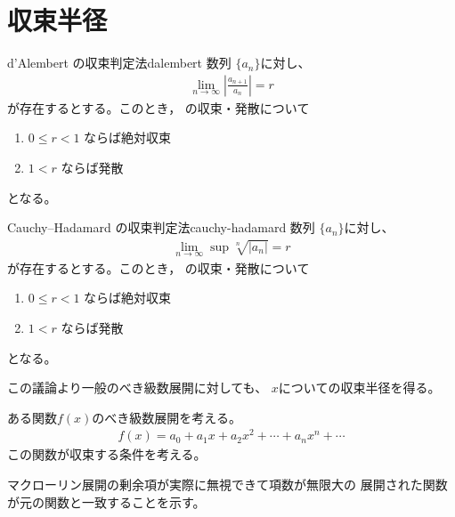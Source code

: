 \newpage
\section{収束半径}
\begin{theorem}{d'Alembert の収束判定法}{dalembert}
  数列 $\{a_{n}\}$に対し、
  \begin{gather}
    \lim_{n\to\infty}\left|\frac{a_{n+1}}{a_n}\right| = r \label{eq:dalembert}
  \end{gather}
  が存在するとする。このとき，
  の収束・発散について
  \begin{enumerate}[label=\cdot]
    \item $0\leq r<1$ ならば絶対収束
    \item $1<r$ ならば発散
  \end{enumerate}
  となる。
\end{theorem}

\begin{theorem}{Cauchy--Hadamard の収束判定法}{cauchy-hadamard}
  数列 $\{a_{n}\}$に対し、
  \begin{gather}
    \lim_{n\to\infty}\sup \sqrt[n]{|a_{n}|} = r \label{eq:cauchy-hadamard}
  \end{gather}
  が存在するとする。このとき，
  の収束・発散について
  \begin{enumerate}[label=\cdot]
    \item $0\leq r<1$ ならば絶対収束
    \item $1<r$ ならば発散
  \end{enumerate}
  となる。
\end{theorem}



この議論より一般のべき級数展開に対しても、
$x$についての収束半径を得る。

ある関数$f(x)$のべき級数展開を考える。
\begin{gather}
  f(x) = a_0 + a_1 x + a_2 x^2 + \cdots + a_n x^n + \cdots
\end{gather}
この関数が収束する条件を考える。

マクローリン展開の剰余項が実際に無視できて項数が無限大の
展開された関数が元の関数と一致することを示す。
